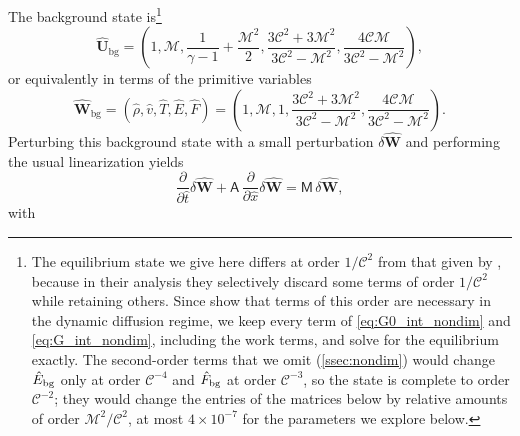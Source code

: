 \documentclass[preprint,12pt,authoryear]{elsarticle}
\newcommand{\tenA}{\mathsf{A}}
\newcommand{\tenM}{\mathsf{M}}
\newcommand{\hatt}{\hat{t}}
\newcommand{\hrho}{\hat{\rho}}
\newcommand{\hE}{\hat{E}}
\newcommand{\hv}{\hat{v}}
\newcommand{\hF}{\hat{F}}
\newcommand{\hx}{\hat{x}}
\newcommand{\hT}{\hat{T}}
\newcommand{\hvecU}{{\hat{\mathbf{U}}}}
\newcommand{\hvecW}{{\hat{\mathbf{W}}}}
\newcommand{\calC}{\mathcal{C}}
\newcommand{\calM}{\mathcal{M}}
\begin{document}
The background state is\footnote{The equilibrium state we give here differs at order $1/\calC^2$ from that given by \citet{Lowrie99a}, because in their analysis they selectively discard some terms of order $1/\calC^2$ while retaining others. Since \citet{Krumholz07b} show that terms of this order are necessary in the dynamic diffusion regime, we keep every term of \autoref{eq:G0_int_nondim} and \autoref{eq:G_int_nondim}, including the work terms, and solve for the equilibrium exactly. The second-order terms that we omit (\autoref{ssec:nondim}) would change $\hE_{\rm bg}$ only at order $\calC^{-4}$ and $\hF_{\rm bg}$ at order $\calC^{-3}$, so the state is complete to order $\calC^{-2}$; they would change the entries of the matrices below by relative amounts of order $\calM^2/\calC^2$, at most $4\times10^{-7}$ for the parameters we explore below.}
\begin{equation}
    \hvecU_{\mathrm{bg}} = \left(1, \calM, \frac{1}{\gamma-1} + \frac{\calM^2}{2}, \frac{3\calC^2 + 3\calM^2}{3\calC^2-\calM^2}, \frac{4\calC\calM}{3\calC^2-\calM^2}\right),
\end{equation}
or equivalently in terms of the primitive variables
\begin{equation}
    \hvecW_\mathrm{bg} = \left(\hrho, \hv, \hT, \hE, \hF\right) = \left(1, \calM, 1, \frac{3\calC^2 + 3\calM^2}{3\calC^2-\calM^2}, \frac{4\calC\calM}{3\calC^2-\calM^2}\right).
\end{equation}
Perturbing this background state with a small perturbation $\delta\hvecW$ and performing the usual linearization yields
\begin{equation}
    \frac{\partial}{\partial\hatt}\delta\hvecW + \tenA\,\frac{\partial}{\partial\hx}\delta\hvecW = \tenM\,\delta\hvecW,
    \label{eq:linear}
\end{equation}
with
\end{document}

